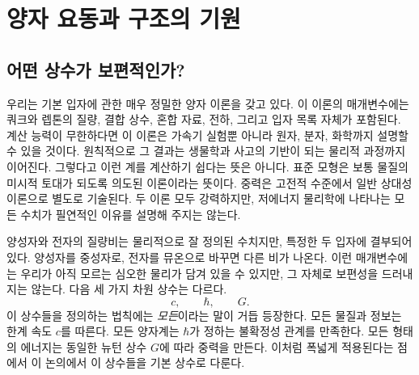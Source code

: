 \chapter{양자 요동과 구조의 기원}


\section{어떤 상수가 보편적인가?}

우리는 기본 입자에 관한 매우 정밀한 양자 이론을 갖고 있다. 이 이론의 매개변수에는 쿼크와 렙톤의 질량, 결합 상수, 혼합 자료, 전하, 그리고 입자 목록 자체가 포함된다. 계산 능력이 무한하다면 이 이론은 가속기 실험뿐 아니라 원자, 분자, 화학까지 설명할 수 있을 것이다. 원칙적으로 그 결과는 생물학과 사고의 기반이 되는 물리적 과정까지 이어진다. 그렇다고 이런 계를 계산하기 쉽다는 뜻은 아니다. 표준 모형은 보통 물질의 미시적 토대가 되도록 의도된 이론이라는 뜻이다. 중력은 고전적 수준에서 일반 상대성 이론으로 별도로 기술된다. 두 이론 모두 강력하지만, 저에너지 물리학에 나타나는 모든 수치가 필연적인 이유를 설명해 주지는 않는다.

양성자와 전자의 질량비는 물리적으로 잘 정의된 수치지만, 특정한 두 입자에 결부되어 있다. 양성자를 중성자로, 전자를 뮤온으로 바꾸면 다른 비가 나온다. 이런 매개변수에는 우리가 아직 모르는 심오한 물리가 담겨 있을 수 있지만, 그 자체로 보편성을 드러내지는 않는다. 다음 세 가지 차원 상수는 다르다.
\[
c,\qquad \hbar,\qquad G.
\]
이 상수들을 정의하는 법칙에는 \emph{모든}이라는 말이 거듭 등장한다. 모든 물질과 정보는 한계 속도 \(c\)를 따른다. 모든 양자계는 \(\hbar\)가 정하는 불확정성 관계를 만족한다. 모든 형태의 에너지는 동일한 뉴턴 상수 \(G\)에 따라 중력을 만든다. 이처럼 폭넓게 적용된다는 점에서 이 논의에서 이 상수들을 기본 상수로 다룬다.

